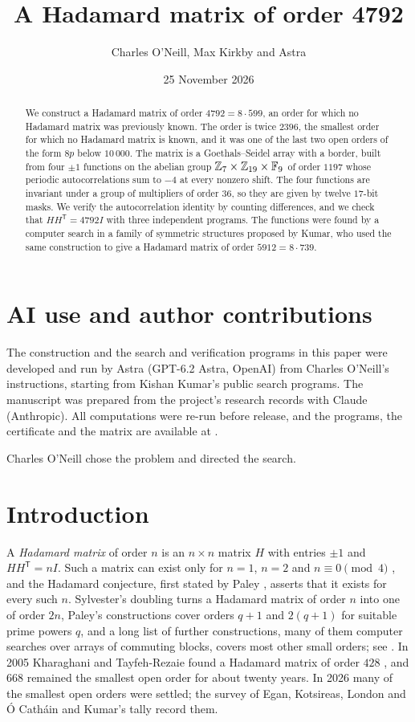 \documentclass[11pt,colorlinks]{charlie}
\title{A Hadamard matrix of order 4792}
\author{Charles O'Neill, Max Kirkby and Astra}
\date{25 November 2026}
\newcommand{\F}{\mathbb{F}}
\newcommand{\T}{\mathsf T}
\renewcommand{\aiusestatement}{The construction and the search and verification programs in this paper were developed and run by Astra (GPT-6.2 Astra, OpenAI) from Charles O'Neill's instructions, starting from Kishan Kumar's public search programs. The manuscript was prepared from the project's research records with Claude (Anthropic). All computations were re-run before release, and the programs, the certificate and the matrix are available at \coderepo.}
\begin{document}
\maketitle

\begin{abstract}
We construct a Hadamard matrix of order $4792=8\cdot599$, an order for which no Hadamard matrix was previously known. The order is twice $2396$, the smallest order for which no Hadamard matrix is known, and it was one of the last two open orders of the form $8p$ below $10\,000$. The matrix is a Goethals--Seidel array with a border, built from four $\pm1$ functions on the abelian group $\Z_7\times\Z_{19}\times\F_9$ of order $1197$ whose periodic autocorrelations sum to $-4$ at every nonzero shift. The four functions are invariant under a group of multipliers of order $36$, so they are given by twelve $17$-bit masks. We verify the autocorrelation identity by counting differences, and we check that $HH^{\T}=4792I$ with three independent programs. The functions were found by a computer search in a family of symmetric structures proposed by Kumar, who used the same construction to give a Hadamard matrix of order $5912=8\cdot739$.
\end{abstract}

\section*{AI use and author contributions}
\aiusestatement

Charles O'Neill chose the problem and directed the search. \responsibilitystatement

\section{Introduction}
A \emph{Hadamard matrix} of order $n$ is an $n\times n$ matrix $H$ with entries $\pm1$ and $HH^{\T}=nI$. Such a matrix can exist only for $n=1$, $n=2$ and $n\equiv0\pmod4$ \cite{Hadamard}, and the Hadamard conjecture, first stated by Paley \cite{Paley}, asserts that it exists for every such $n$. Sylvester's doubling \cite{Sylvester} turns a Hadamard matrix of order $n$ into one of order $2n$, Paley's constructions \cite{Paley} cover orders $q+1$ and $2(q+1)$ for suitable prime powers $q$, and a long list of further constructions, many of them computer searches over arrays of commuting blocks, covers most other small orders; see \cite{SY,EKLO}. In 2005 Kharaghani and Tayfeh-Rezaie found a Hadamard matrix of order $428$ \cite{KTR}, and $668$ remained the smallest open order for about twenty years. In 2026 many of the smallest open orders were settled; the survey of Egan, Kotsireas, London and \'O Cath\'ain \cite{EKLO} and Kumar's tally \cite{Kumar} record them.
\end{document}
